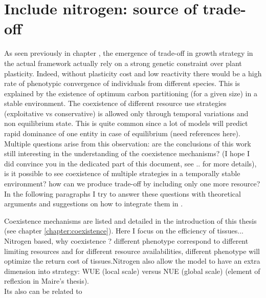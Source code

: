 \section{Include nitrogen: source of trade-off} %

As seen previously in chapter %
, the emergence of trade-off in growth strategy in the actual framework actually rely on a strong genetic constraint over plant plasticity. Indeed, without plasticity cost and low reactivity there would be a high rate of phenotypic convergence of individuals from different species. This is explained by the existence of optimum carbon partitioning (for a given size) in a stable environment. The coexistence of different resource use strategies (exploitative vs conservative) is allowed only through temporal variations and non equilibrium state. This is quite common since a lot of models will predict rapid dominance of one entity in case of equilibrium (need references here).\\
Multiple questions arise from this observation: are the conclusions of this work still interesting in the understanding of the coexistence mechanisms? (I hope I did convince you in the dedicated part of this document, see .. for more details), is it possible to see coexistence of multiple strategies in a temporally stable environment? how can we produce trade-off by including only one more resource?\\

In the following paragraphs I try to answer these questions with theoretical arguments and suggestions on how to integrate them in \model.


Coexistence mechanisms are listed and detailed in the introduction of this thesis (see chapter \ref{chapter:coexistence}). Here I focus on the efficiency of tissues... Nitrogen based, why coexistence ? different phenotype correspond to different limiting resources and for different resource availabilities, different phenotype will optimize the return cost of tissues.Nitrogen also allow the model to have an extra dimension into strategy: WUE (local scale) versus NUE (global scale) (element of reflexion in Maire's thesis).\\
Its also can be related to



